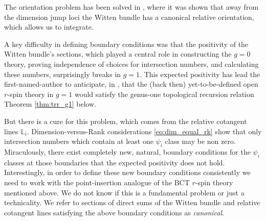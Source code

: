 \documentclass[11pt]{amsart}
\theoremstyle{definition}
\theoremstyle{remark}
\newcommand{\CL}{{\mathbb{L}}}
\newcommand{\<}{\left<}
\renewcommand{\>}{\right>}
\numberwithin{equation}{section}
\begin{document}
The orientation problem has been solved in \cite[\S 3]{TZ1}, where it was shown that away from the dimension %
jump loci the %
Witten bundle has a canonical relative orientation, which allows us to integrate.

A key difficulty in defining boundary conditions was that the positivity of the Witten bundle's sections, which played a central role in constructing the $g=0$ theory, proving independence of choices for intersection numbers, and calculating these numbers, surprisingly breaks in $g=1.$
This expected positivity has lead %
the first-named-author to %
anticipate, in \cite{BCT3}, that the (back then) yet-to-be-defined open $r$-spin theory in $g=1$ would satisfy the genus-one topological recursion relation %
Theorem \ref{thm:trr_g1} below.

But %
there is a cure for %
this problem, which %
comes from the relative cotangent lines %
$\CL_i.$ Dimension-versus-Rank considerations %
\eqref{eq:dim_equal_rk} show %
that only intersection numbers which contain at least one $\psi_i$ class may be non zero. Miraculously, there exist completely new, natural, boundary conditions for %
the $\psi_i$ classes at those boundaries that the expected positivity does not hold. Interestingly, in order to define these new boundary %
conditions consistently we %
need to work with the point-insertion analogue of the BCT $r$-spin theory mentioned above. We do not know if this is a fundamental problem or just a technicality. We refer to sections of direct sums of the Witten bundle and relative cotangent lines satisfying the above boundary conditions as \emph{canonical}.
\end{document}
